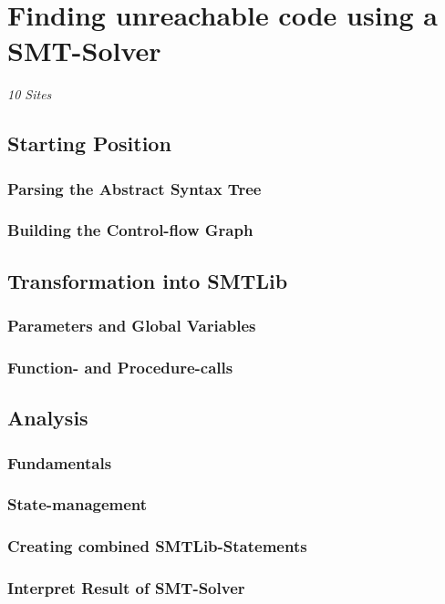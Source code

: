 
\chapter{Finding unreachable code using a SMT-Solver}
\label{cha:finding unreachable code using a smt-solver}
\emph{10 Sites}

\section{Starting Position}
\subsection{Parsing the Abstract Syntax Tree}
\subsection{Building the Control-flow Graph}
\section{Transformation into SMTLib}
\subsection{Parameters and Global Variables}
\subsection{Function- and Procedure-calls}
\section{Analysis}
\subsection{Fundamentals}
\subsection{State-management}
\subsection{Creating combined SMTLib-Statements}
\subsection{Interpret Result of SMT-Solver}
